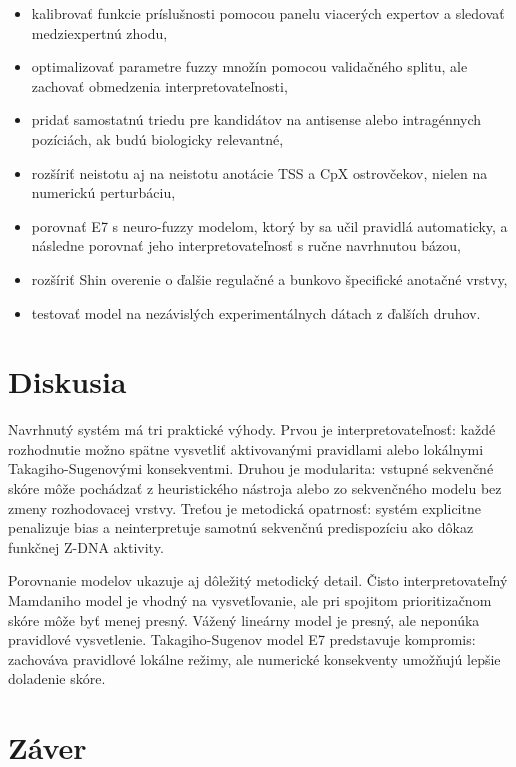 \documentclass[12pt,a4paper]{article}
\begin{document}
\begin{itemize}
  \item kalibrovať funkcie príslušnosti pomocou panelu viacerých expertov a sledovať medziexpertnú zhodu,
  \item optimalizovať parametre fuzzy množín pomocou validačného splitu, ale zachovať obmedzenia interpretovateľnosti,
  \item pridať samostatnú triedu pre kandidátov na antisense alebo intragénnych pozíciách, ak budú biologicky relevantné,
  \item rozšíriť neistotu aj na neistotu anotácie TSS a CpX ostrovčekov, nielen na numerickú perturbáciu,
  \item porovnať E7 s neuro-fuzzy modelom, ktorý by sa učil pravidlá automaticky, a následne porovnať jeho interpretovateľnosť s ručne navrhnutou bázou,
  \item rozšíriť Shin overenie o ďalšie regulačné a bunkovo špecifické anotačné vrstvy,
  \item testovať model na nezávislých experimentálnych dátach z ďalších druhov.
\end{itemize}

\section{Diskusia}

Navrhnutý systém má tri praktické výhody. Prvou je interpretovateľnosť: každé rozhodnutie možno spätne vysvetliť aktivovanými pravidlami alebo lokálnymi Takagiho-Sugenovými konsekventmi. Druhou je modularita: vstupné sekvenčné skóre môže pochádzať z heuristického nástroja alebo zo sekvenčného modelu bez zmeny rozhodovacej vrstvy. Treťou je metodická opatrnosť: systém explicitne penalizuje bias a neinterpretuje samotnú sekvenčnú predispozíciu ako dôkaz funkčnej Z-DNA aktivity.

Porovnanie modelov ukazuje aj dôležitý metodický detail. Čisto interpretovateľný Mamdaniho model je vhodný na vysvetľovanie, ale pri spojitom prioritizačnom skóre môže byť menej presný. Vážený lineárny model je presný, ale neponúka pravidlové vysvetlenie. Takagiho-Sugenov model E7 predstavuje kompromis: zachováva pravidlové lokálne režimy, ale numerické konsekventy umožňujú lepšie doladenie skóre.

\section{Záver}
\end{document}
